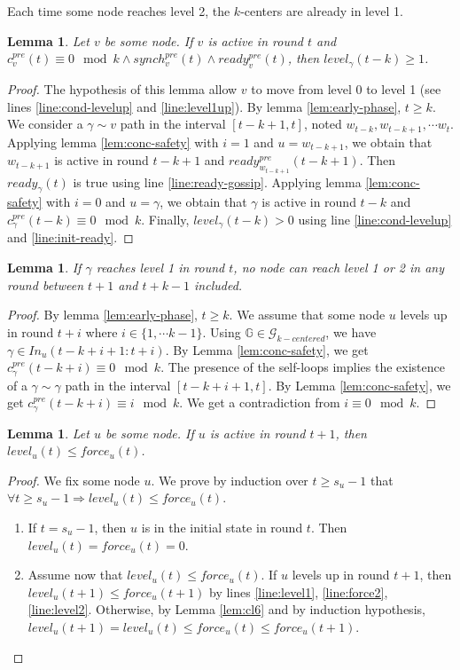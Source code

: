 \documentclass[11pt,letterpaper]{article}
\newtheorem{lem}[thm]{Lemma}
\newcommand{\cent}{\gamma}
\begin{document}
Each time some node reaches level 2, the $k$-centers are already in level 1.
\begin{lem} \label{lem:conc-safety-bis}
	Let $v$ be some node.
	If $v$ is active in round $t$ and $c^{pre}_v(t) \equiv 0 \mod k \wedge synch^{pre}_v(t) \wedge ready^{pre}_v(t)$, then
	$level_\cent(t-k) \geq 1$.
\end{lem}
\begin{proof}
	The hypothesis of this lemma allow $v$ to move from level 0 to level 1 (see lines \ref{line:cond-levelup} and \ref{line:level1up}). By lemma \ref{lem:early-phase}, $t \geq k$.
	We consider a $\cent \sim v$ path in the interval $[t-k+1,t]$, noted $w_{t-k}, w_{t-k+1}, \cdots w_t$.
	Applying lemma \ref{lem:conc-safety} with $i = 1$ and $u = w_{t-k+1}$, we obtain that $w_{t-k+1}$ is active in round $t-k+1$ and $ready^{pre}_{w_{t-k+1}}(t-k+1)$.
	Then $ready_\cent(t)$ is true using line \ref{line:ready-gossip}.
	Applying lemma \ref{lem:conc-safety} with $i = 0$ and $u = \cent$, we obtain that $\cent$ is active in round $t-k$ and $c^{pre}_\cent(t-k) \equiv 0 \mod k$.
	Finally, $level_\cent(t-k) > 0$ using line \ref{line:cond-levelup} and \ref{line:init-ready}.
\end{proof}

\begin{lem} \label{lem:no-close-level2}
	If $\cent$ reaches level 1 in round $t$, no node can reach level 1 or 2 in any round between $t+1$ and $t+k-1$ included.
\end{lem}
\begin{proof}
	By lemma \ref{lem:early-phase}, $t \geq k$.
	We assume that some node $u$ levels up in round $t+i$ where $i \in \{1, \cdots k-1\}$.
	Using $\mathds{G} \in \mathcal{G}_{k-centered}$, we have $\cent \in In_u(t-k+i+1:t+i)$.
	By Lemma \ref{lem:conc-safety}, we get $c_\cent^{pre}(t-k+i) \equiv 0 \mod k$.
	The presence of the self-loops implies the existence of a $\cent \sim \cent$ path in the interval $[t-k+i+1,t]$.
	By Lemma \ref{lem:conc-safety}, we get $c_\cent^{pre}(t-k+i) \equiv i \mod k$.
	We get a contradiction from $i \equiv 0 \mod k$.
\end{proof}

\begin{lem} \label{lem:greater-force}
	Let $u$ be some node. If $u$ is active in round $t+1$, then $level_u(t) \leq force_u(t)$.
\end{lem}
\begin{proof}
	\noindent We fix some node $u$. We prove by induction over $t \geq s_u-1$ that $\forall t \geq s_u-1 \Rightarrow level_u(t) \leq force_u(t)$.
	\begin{enumerate}
		\item If $t = s_u-1$, then $u$ is in the initial state in round $t$. Then $level_u(t) = force_u(t) = 0$.
		\item Assume now that $level_u(t) \leq force_u(t)$.
			If $u$ levels up in round $t+1$, then $level_u(t+1) \leq force_u(t+1)$ by lines \ref{line:level1}, \ref{line:force2}, \ref{line:level2}.
			Otherwise, by Lemma \ref{lem:cl6} and by induction hypothesis, $level_u(t+1) = level_u(t) \leq force_u(t) \leq force_u(t+1)$.
	\end{enumerate}
\end{proof}
\end{document}

